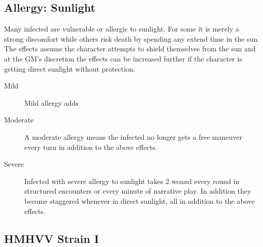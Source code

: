 \documentclass{book}
\begin{document}
\begin{multicols}{2}
 \subsection{Allergy: Sunlight}
 \label{allergysunlight}
 Many infected are vulnerable or allergic to sunlight. For some it is merely a strong discomfort while others risk death by spending any extend time in the sun. The effects assume the character attempts to shield themselves from the sun and at the GM's discretion the effects can be increased further if the character is getting direct sunlight without protection.
 
\begin{description}
	\item[Mild] Mild allergy adds \SetbackDie \SetbackDie 
	\item[Moderate] A moderate allergy means the infected no longer gets a free maneuver every turn in addition to the above effects.
	\item[Severe] Infected with severe allergy to sunlight takes 2 wound every round in structured encounters or every minute of narrative play. In addition they become staggered whenever in direct sunlight, all in addition to the above effects.
\end{description} 
	
\end{multicols}

\subsection{HMHVV Strain I}
\end{document}
